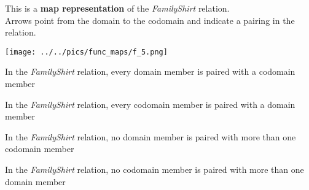 \documentclass{ximera}
\author{Lee Wayand}
\begin{document}
\begin{exercise}

This is a \textbf{map representation} of the \textit{FamilyShirt} relation. \\


Arrows point from the domain to the codomain and indicate a pairing in the relation.


\begin{image}
\texttt{[image: ../../pics/func\_maps/f\_5.png]}
\end{image}




\begin{question} 
In the \textit{FamilyShirt} relation, every domain member is paired with a codomain member

\begin{multipleChoice}
\end{multipleChoice}
\end{question}







\begin{question} 
In the \textit{FamilyShirt} relation, every codomain member is paired with a domain member

\begin{multipleChoice}
\end{multipleChoice}
\end{question}







\begin{question} 
In the \textit{FamilyShirt} relation, no domain member is paired with more than one codomain member

\begin{multipleChoice}
\end{multipleChoice}
\end{question}








\begin{question} 
In the \textit{FamilyShirt} relation, no codomain member is paired with more than one domain member


\end{question}
\end{exercise}
\end{document}

